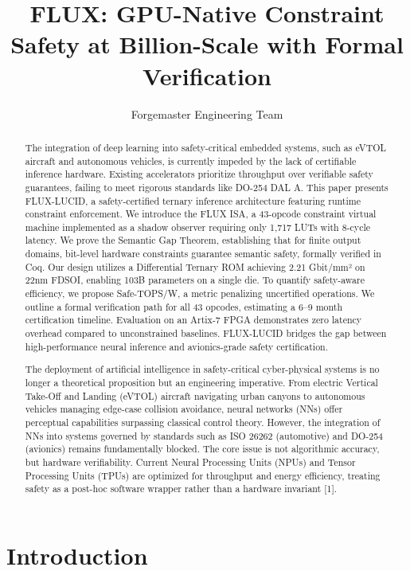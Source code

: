 \documentclass[conference]{IEEEtran}
\title{FLUX: GPU-Native Constraint Safety at Billion-Scale with Formal Verification}
\author{Forgemaster Engineering Team}
\begin{document}
\maketitle


\begin{abstract}
The integration of deep learning into safety-critical embedded systems, such as eVTOL aircraft and autonomous vehicles, is currently impeded by the lack of certifiable inference hardware. Existing accelerators prioritize throughput over verifiable safety guarantees, failing to meet rigorous standards like DO-254 DAL A. This paper presents FLUX-LUCID, a safety-certified ternary inference architecture featuring runtime constraint enforcement. We introduce the FLUX ISA, a 43-opcode constraint virtual machine implemented as a shadow observer requiring only 1,717 LUTs with 8-cycle latency. We prove the Semantic Gap Theorem, establishing that for finite output domains, bit-level hardware constraints guarantee semantic safety, formally verified in Coq. Our design utilizes a Differential Ternary ROM achieving 2.21 Gbit/mm² on 22nm FDSOI, enabling 103B parameters on a single die. To quantify safety-aware efficiency, we propose Safe-TOPS/W, a metric penalizing uncertified operations. We outline a formal verification path for all 43 opcodes, estimating a 6–9 month certification timeline. Evaluation on an Artix-7 FPGA demonstrates zero latency overhead compared to unconstrained baselines. FLUX-LUCID bridges the gap between high-performance neural inference and avionics-grade safety certification.


The deployment of artificial intelligence in safety-critical cyber-physical systems is no longer a theoretical proposition but an engineering imperative. From electric Vertical Take-Off and Landing (eVTOL) aircraft navigating urban canyons to autonomous vehicles managing edge-case collision avoidance, neural networks (NNs) offer perceptual capabilities surpassing classical control theory. However, the integration of NNs into systems governed by standards such as ISO 26262 (automotive) and DO-254 (avionics) remains fundamentally blocked. The core issue is not algorithmic accuracy, but hardware verifiability. Current Neural Processing Units (NPUs) and Tensor Processing Units (TPUs) are optimized for throughput and energy efficiency, treating safety as a post-hoc software wrapper rather than a hardware invariant [1].
\end{abstract}

\section{Introduction}
\end{document}
